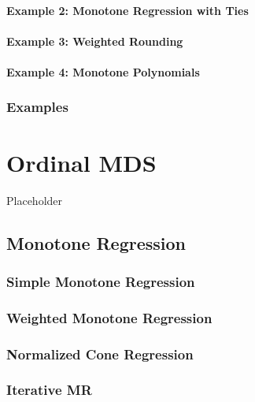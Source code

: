 \documentclass[
  12pt,
]{book}
\begin{document}
\subsubsection{Example 2: Monotone Regression with Ties}\label{example-2-monotone-regression-with-ties}

\subsubsection{Example 3: Weighted Rounding}\label{example-3-weighted-rounding}

\subsubsection{Example 4: Monotone Polynomials}\label{example-4-monotone-polynomials}

\subsection{Examples}\label{examples-1}

\chapter{Ordinal MDS}\label{chapordinal}

Placeholder

\section{Monotone Regression}\label{mathmonreg}

\subsection{Simple Monotone Regression}\label{mathsimpiso}

\subsection{Weighted Monotone Regression}\label{mathweigmr}

\subsection{Normalized Cone Regression}\label{mathnorcone}

\subsection{Iterative MR}\label{iterative-mr}
\end{document}
